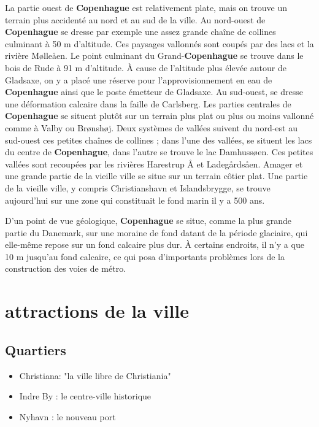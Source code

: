 \documentclass[a4paper,10pt,openany]{memoir}
\begin{document}
La partie ouest de \textbf{Copenhague} est relativement plate, mais on trouve un terrain plus accidenté au nord 
et au sud de la ville.
Au nord-ouest de \textbf{Copenhague} se dresse par exemple une assez grande chaîne de collines culminant à 50 m 
d'altitude. Ces paysages vallonnés sont coupés par des lacs et la rivière Mølleåen.
Le point culminant du Grand-\textbf{Copenhague} se trouve dans le bois de Rude à 91 m d'altitude. À cause de 
l'altitude plus élevée autour de Gladsaxe, on y a placé une réserve pour l'approvisionnement en eau de 
\textbf{Copenhague} ainsi que le poste émetteur de Gladsaxe.
Au sud-ouest, se dresse une déformation calcaire dans la faille de Carlsberg.
Les parties centrales de \textbf{Copenhague} se situent plutôt sur un terrain plus plat ou plus ou moins vallonné 
comme à Valby ou Brønshøj.
Deux systèmes de vallées suivent du nord-est au sud-ouest ces petites chaînes de collines ; dans l'une des
vallées, se situent les lacs du centre de \textbf{Copenhague}, dans l'autre se trouve le lac Damhussøen. Ces petites
vallées sont recoupées par les rivières Harestrup Å et Ladegårdsåen.
Amager et une grande partie de la vieille ville se situe sur un terrain côtier plat. Une partie de la 
vieille ville, y compris Christianshavn et Islandsbrygge, se trouve aujourd'hui sur une zone qui constituait
le fond marin il y a 500 ans.

D'un point de vue géologique, \textbf{Copenhague} se situe, comme la plus grande partie du Danemark, sur une moraine
de fond datant de la période glaciaire, qui elle-même repose sur un fond calcaire plus dur. À certains 
endroits, il n'y a que 10 m jusqu'au fond calcaire, ce qui posa d'importants problèmes lors de la 
construction des voies de métro.

\chapter{attractions de la ville}

\section{Quartiers}
\begin{itemize}
 \item Christiana: "la ville libre de Christiania"
 \item Indre By : le centre-ville historique
 \item Nyhavn : le nouveau port
\end{itemize}
\end{document}
